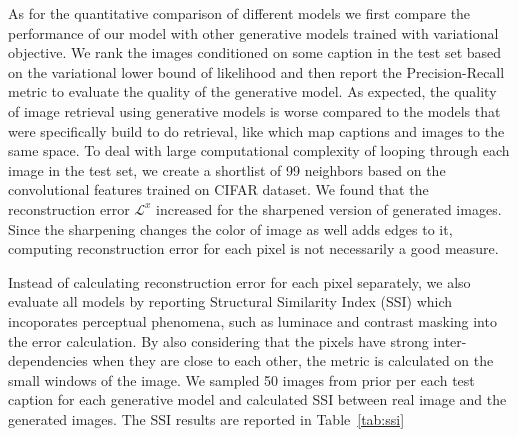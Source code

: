 \documentclass{article} %
\newcommand{\rloss}{\mathcal{L}^{x}}
\begin{document}
As for the quantitative comparison of different models we first compare the performance of our model with other generative models trained with variational objective. We rank the images conditioned on some caption in the test set based on the variational lower bound of likelihood and then report the Precision-Recall metric to evaluate the quality of the generative model. As expected, the quality of image retrieval using generative models is worse compared to the models that were specifically build to do retrieval, like \cite{kiros_captions} which map captions and images to the same space. To deal with large computational complexity of looping through each image in the test set, we create a shortlist of 99 neighbors based on the convolutional features trained on CIFAR dataset. We found that the reconstruction error $\rloss$ increased for the sharpened version of generated images. Since the sharpening changes the color of image as well adds edges to it, computing reconstruction error for each pixel is not necessarily a good measure.

Instead of calculating reconstruction error for each pixel separately, we also evaluate all models by reporting Structural Similarity Index (SSI) which incoporates perceptual phenomena, such as luminace and contrast masking into the error calculation. By also considering that the pixels have strong inter-dependencies when they are close to each other, the metric is calculated on the small windows of the image. We sampled 50 images from prior per each test caption for each generative model and calculated SSI between real image and the generated images. The SSI results are reported in Table~\ref{tab:ssi}
\end{document}
